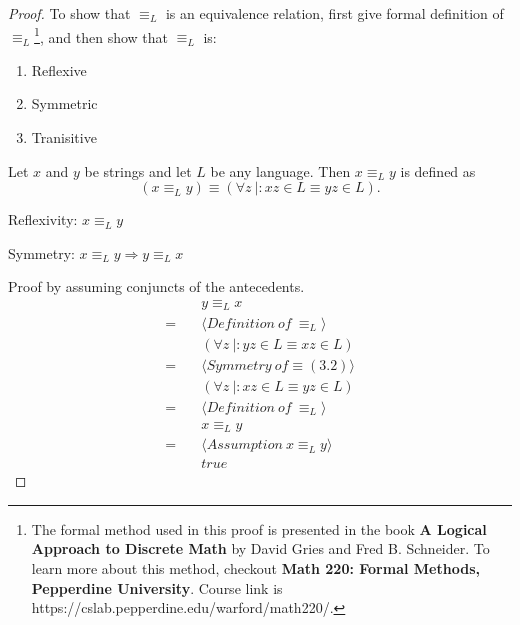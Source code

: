 \documentclass[11pt]{article}
\newenvironment{theorem}[2][Theorem]{\begin{trivlist}
\item[\hskip \labelsep {\bfseries #1}\hskip \labelsep {\bfseries #2.}]}{\end{trivlist}}
\newenvironment{problem}[2][Problem]{\begin{trivlist}
\item[\hskip \labelsep {\bfseries #1}\hskip \labelsep {\bfseries #2.}]}{\end{trivlist}}
\begin{document}
\begin{proof}
To show that $\equiv_{L}$ is an equivalence relation, first give formal definition of $\equiv_{L}$\footnote{The formal method used in this proof is presented in the book \textbf{A Logical Approach
to Discrete Math} by David Gries and Fred B. Schneider. To learn more about this method, checkout \textbf{Math 220: Formal Methods, Pepperdine University}. Course link is https://cslab.pepperdine.edu/warford/math220/.}, and then show that $\equiv_{L}$ is:
\begin{enumerate}
\item Reflexive
\item Symmetric
\item Tranisitive
\end{enumerate}
\begin{theorem}[Definition]{$\equiv_{L}$} 
Let $x$ and $y$ be strings and let $L$ be any language. Then $x \equiv_{L} y$ is defined as
\[
(x \equiv_{L} y) \equiv (\forall z \ |: xz \in L \equiv yz \in L).
\]
\end{theorem}

\begin{problem}[Part]{1}
Reflexivity: $x \equiv_{L} y$
\end{problem}

\begin{problem}[Part]{2}
Symmetry: $x \equiv_{L} y \Rightarrow y \equiv_{L} x$
\end{problem}
Proof by assuming conjuncts of the antecedents.
\begin{align*}
&\quad y \equiv_{L} x \\
= &\quad \langle Definition \ of \ \equiv_{L} \rangle \\
&\quad (\forall z \ |: yz \in L \equiv xz \in L) \\
= &\quad \langle Symmetry \ of \equiv (3.2) \rangle \\
&\quad (\forall z \ |: xz \in L \equiv yz \in L) \\
= &\quad \langle Definition \ of \ \equiv_{L} \rangle \\
&\quad x \equiv_{L} y \\
= &\quad \langle Assumption \ x \equiv_{L} y \rangle \\
&\quad true
\end{align*}


\end{proof}
\end{document}
